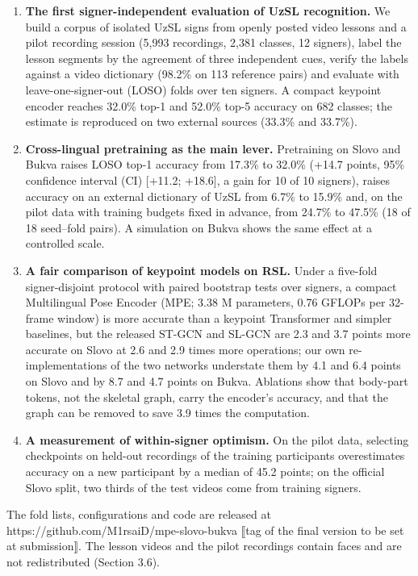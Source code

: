 \begin{enumerate}
\def\labelenumi{\arabic{enumi}.}
\tightlist
\item
  \textbf{The first signer-independent evaluation of UzSL recognition.} We build a corpus of isolated UzSL signs from openly posted video lessons and a pilot recording session (5,993 recordings, 2,381 classes, 12 signers), label the lesson segments by the agreement of three independent cues, verify the labels against a video dictionary (98.2\% on 113 reference pairs) and evaluate with leave-one-signer-out (LOSO) folds over ten signers. A compact keypoint encoder reaches 32.0\% top-1 and 52.0\% top-5 accuracy on 682 classes; the estimate is reproduced on two external sources (33.3\% and 33.7\%).
\item
  \textbf{Cross-lingual pretraining as the main lever.} Pretraining on Slovo and Bukva raises LOSO top-1 accuracy from 17.3\% to 32.0\% (+14.7 points, 95\% confidence interval (CI) {[}+11.2; +18.6{]}, a gain for 10 of 10 signers), raises accuracy on an external dictionary of UzSL from 6.7\% to 15.9\% and, on the pilot data with training budgets fixed in advance, from 24.7\% to 47.5\% (18 of 18 seed--fold pairs). A simulation on Bukva shows the same effect at a controlled scale.
\item
  \textbf{A fair comparison of keypoint models on RSL.} Under a five-fold signer-disjoint protocol with paired bootstrap tests over signers, a compact Multilingual Pose Encoder (MPE; 3.38 M parameters, 0.76 GFLOPs per 32-frame window) is more accurate than a keypoint Transformer and simpler baselines, but the released ST-GCN \citep{2018_yan_stgcn} and SL-GCN \citep{2021_jiang_sam_slr} are 2.3 and 3.7 points more accurate on Slovo at 2.6 and 2.9 times more operations; our own re-implementations of the two networks understate them by 4.1 and 6.4 points on Slovo and by 8.7 and 4.7 points on Bukva. Ablations show that body-part tokens, not the skeletal graph, carry the encoder's accuracy, and that the graph can be removed to save 3.9 times the computation.
\item
  \textbf{A measurement of within-signer optimism.} On the pilot data, selecting checkpoints on held-out recordings of the training participants overestimates accuracy on a new participant by a median of 45.2 points; on the official Slovo split, two thirds of the test videos come from training signers.
\end{enumerate}

The fold lists, configurations and code are released at https://github.com/M1rsaiD/mpe-slovo-bukva ⟦tag of the final version to be set at submission⟧. The lesson videos and the pilot recordings contain faces and are not redistributed (Section 3.6).

